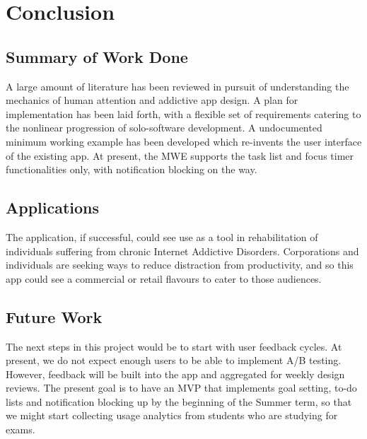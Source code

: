 \chapter{Conclusion}

\label{ch:conclusions}

\section{Summary of Work Done}
A large amount of literature has been reviewed in pursuit of understanding the mechanics of human attention and addictive app design. A plan for implementation has been laid forth, with a flexible set of requirements catering to the nonlinear progression of solo-software development. A undocumented minimum working example has been developed which re-invents the user interface of the existing app. At present, the MWE supports the task list and focus timer functionalities only, with notification blocking on the way.


\section{Applications}
The application, if successful, could see use as a tool in rehabilitation of individuals suffering from chronic Internet Addictive Disorders. Corporations and individuals are seeking ways to reduce distraction from productivity, and so this app could see a commercial or retail flavours to cater to those audiences.

\section{Future Work}
The next steps in this project would be to start with user feedback cycles. At present, we do not expect enough users to be able to implement A/B testing. However, feedback will be built into the app and aggregated for weekly design reviews. The present goal is to have an MVP that implements goal setting, to-do lists and notification blocking up by the beginning of the Summer term, so that we might start collecting usage analytics from students who are studying for exams.